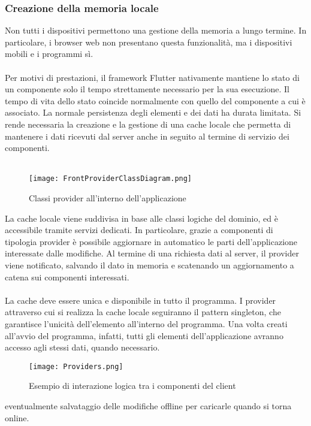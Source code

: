 \subsubsection{ Creazione della memoria locale}
Non tutti i dispositivi permettono una gestione della memoria a lungo termine. 
In particolare, i browser web non presentano questa funzionalità, ma i dispositivi mobili e i programmi sì. \\
\\
Per motivi di prestazioni, il framework Flutter nativamente mantiene lo stato di un componente solo il tempo strettamente necessario per la sua esecuzione. 
Il tempo di vita dello stato coincide normalmente con quello del componente a cui è associato. 
La normale persistenza degli elementi e dei dati ha durata limitata. 
Si rende necessaria la creazione e la gestione di una cache locale che permetta di mantenere i dati ricevuti dal server anche in seguito al termine di servizio dei componenti.\\
\\
\begin{figure}[h!]
    \centering
    \texttt{[image: FrontProviderClassDiagram.png]}
    \caption{Classi provider all'interno dell'applicazione}
\end{figure}	
La cache locale viene suddivisa in base alle classi logiche del dominio, ed è accessibile tramite servizi dedicati. 
In particolare, grazie a componenti di tipologia provider è possibile aggiornare in automatico le parti dell’applicazione interessate dalle modifiche. 
Al termine di una richiesta dati al server, il provider viene notificato, salvando il dato in memoria e scatenando un aggiornamento a catena sui componenti interessati.\\
\\
La cache deve essere unica e disponibile in tutto il programma. 
I provider attraverso cui si realizza la cache locale seguiranno il pattern singleton, che garantisce l’unicità dell’elemento all’interno del programma. 
Una volta creati all’avvio del programma, infatti, tutti gli elementi dell’applicazione avranno accesso agli stessi dati, quando necessario.

\begin{figure}[h!]
    \centering
    \texttt{[image: Providers.png]}
    \caption{Esempio di interazione logica tra i componenti del client}
\end{figure}	

eventualmente salvataggio delle modifiche offline per caricarle quando si torna online. \\
\clearpage
